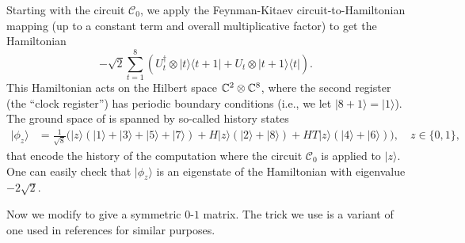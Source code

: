 \documentclass[../thesis-main/thesis-main]{subfiles}
\begin{document}
Starting with the circuit $\mathcal{C}_{0}$, we apply the Feynman-Kitaev circuit-to-Hamiltonian mapping \cite{Fey85,KSV02} (up to a constant term and overall multiplicative factor) to get the Hamiltonian
\begin{equation}
-\sqrt{2}\sum_{t=1}^{8}\left(U_{t}^{\dagger}\otimes|t\rangle\langle t+1|+U_{t}\otimes|t+1\rangle\langle t|\right).\label{eq:single_qubit_ham}
\end{equation}
This Hamiltonian acts on the Hilbert space $\mathbb{C}^{2}\otimes\mathbb{C}^{8}$, where the second register (the ``clock register'') has periodic boundary conditions (i.e., we let $|8+1\rangle=|1\rangle$). The ground space of  is spanned by so-called history states
\begin{align*}
  |\phi_{z}\rangle & 
  =\frac{1}{\sqrt{8}} \big(|z\rangle(|1\rangle+|3\rangle+|5\rangle+|7\rangle)
    +H|z\rangle(|2\rangle+|8\rangle)
    +HT|z\rangle(|4\rangle+|6\rangle)\big),
  \quad z\in\{0,1\},
\end{align*}
that encode the history of the computation where the circuit $\mathcal{C}_{0}$ is applied to $|z\rangle$. One can easily check that $|\phi_{z}\rangle$ is an eigenstate of the Hamiltonian with eigenvalue $-2\sqrt{2}$. 

Now we modify  to give a symmetric $0$-$1$ matrix. The trick we use is a variant of one used in references \cite{JW06,JGL10} for similar purposes. 
\end{document}
